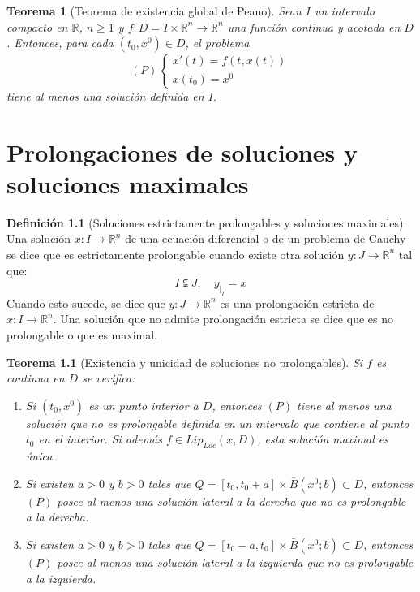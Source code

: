 \documentclass{report}
\newtheorem{theorem}{Teorema}[chapter]
\theoremstyle{remark}
\theoremstyle{remark}
\theoremstyle{remark}
\theoremstyle{definition}
\newtheorem{definition}{Definición}[chapter]
\theoremstyle{definition}
\theoremstyle{definition}
\begin{document}
\begin{theorem}[Teorema de existencia global de Peano]
    Sean $I$ un intervalo compacto en $\mathbb{R}$, $n \geq 1$ y $f: D = I \times \mathbb{R}^n \to \mathbb{R}^n$ una función continua y acotada en $D$.
    Entonces, para cada $(t_0, x^0) \in D$, el problema
    $$(P) \begin{cases}
            x'(t) = f(t, x(t)) \\
            x(t_0) = x^0
        \end{cases}$$
    tiene al menos una solución definida en $I$.
\end{theorem}

\chapter{Prolongaciones de soluciones y soluciones maximales}
\begin{definition}[Soluciones estrictamente prolongables y soluciones maximales]
    Una solución $x: I \to \mathbb{R}^n$ de una ecuación diferencial o de un problema de Cauchy se dice que es estrictamente prolongable cuando existe otra solución $y: J \to \mathbb{R}^n$ tal que:
    $$I \subsetneqq J, \quad y_{|_I} = x$$
    Cuando esto sucede, se dice que $y: J \to \mathbb{R}^n$ es una prolongación estricta de $x: I \to \mathbb{R}^n$.
    Una solución que no admite prolongación estricta se dice que es no prolongable o que es maximal.
\end{definition}

\begin{theorem}[Existencia y unicidad de soluciones no prolongables]
    Si $f$ es continua en $D$ se verifica:
    \begin{enumerate}
        \item Si $(t_0, x^0)$ es un punto interior a $D$, entonces $(P)$ tiene al menos una solución que no es prolongable definida en un intervalo que contiene al punto $t_0$ en el interior.
              Si además $f \in Lip_{Loc}(x, D)$, esta solución maximal es única.
        \item Si existen $a > 0$ y $b > 0$ tales que $Q = [t_0, t_0 + a] \times \bar{B}(x^0; b) \subset D$, entonces $(P)$ posee al menos una solución lateral a la derecha que no es prolongable a la derecha.
        \item Si existen $a > 0$ y $b > 0$ tales que $Q = [t_0 - a, t_0] \times \bar{B}(x^0; b) \subset D$, entonces $(P)$ posee al menos una solución lateral a la izquierda que no es prolongable a la izquierda.
    \end{enumerate}
\end{theorem}
\end{document}
